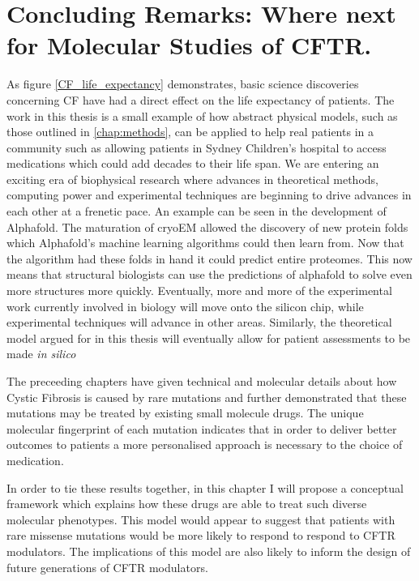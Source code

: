 \chapter{Concluding Remarks: Where next for Molecular Studies of CFTR.}
\label{chap:conclusion}

As figure \ref{CF_life_expectancy} demonstrates, basic science discoveries concerning CF have had a direct effect on the life expectancy of patients. The work in this thesis is a small example of how abstract physical models, such as those outlined in \ref{chap:methods}, can be applied to help real patients in a community such as allowing patients in Sydney Children's hospital to access medications which could add decades to their life span. We are entering an exciting era of biophysical research where advances in theoretical methods, computing power and experimental techniques are beginning to drive advances in each other at a frenetic pace. An example can be seen in the development of Alphafold. The maturation of cryoEM allowed the discovery of new protein folds which Alphafold's machine learning algorithms could then learn from. Now that the algorithm had these folds in hand it could predict entire proteomes. This now means that structural biologists can use the predictions of alphafold to solve even more structures more quickly. Eventually, more and more of the experimental work currently involved in biology will move onto the silicon chip, while experimental techniques will advance in other areas. Similarly, the theoretical model argued for in this thesis will eventually allow for patient assessments to be made \textit{in silico}

The preceeding chapters have given technical and molecular details about how Cystic Fibrosis is caused by rare mutations and further demonstrated that these mutations may be treated by existing small molecule drugs. The unique molecular fingerprint of each mutation indicates that in order to deliver better outcomes to patients a more personalised approach is necessary to the choice of medication. 

In order to tie these results together, in this chapter I will propose a conceptual framework which explains how these drugs are able to treat such diverse molecular phenotypes. This model would appear to suggest that patients with rare missense mutations would be more likely to respond to respond to CFTR modulators. The implications of this model are also likely to inform the design of future generations of CFTR modulators. 

